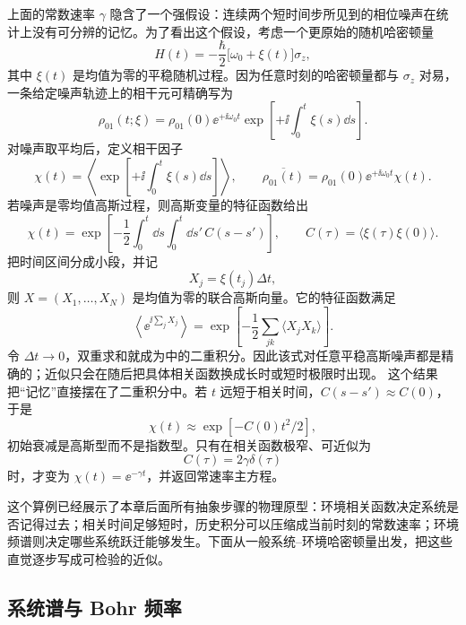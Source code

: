 上面的常数速率 \(\gamma\) 隐含了一个强假设：连续两个短时间步所见到的相位噪声在统计上没有可分辨的记忆。为了看出这个假设，考虑一个更原始的随机哈密顿量
\[
 H(t)=-\frac{\hbar}{2}\bigl[\omega_0+\xi(t)\bigr]\sigma_z,
\]
其中 \(\xi(t)\) 是均值为零的平稳随机过程。因为任意时刻的哈密顿量都与 \(\sigma_z\) 对易，一条给定噪声轨迹上的相干元可精确写为
\[
 \rho_{01}(t;\xi)
 =\rho_{01}(0)\ee^{+\ii\omega_0t}
 \exp\!\left[+\ii\int_0^t\xi(s)\dd s\right].
\]
对噪声取平均后，定义相干因子
\begin{equation}
 \chi(t)=\left\langle
 \exp\!\left[+\ii\int_0^t\xi(s)\dd s\right]
 \right\rangle,
 \qquad
 \overline{\rho_{01}(t)}
 =\rho_{01}(0)\ee^{+\ii\omega_0t}\chi(t).
 \label{eq:phys-oqs-classical-noise-coherence}
\end{equation}
若噪声是零均值高斯过程，则高斯变量的特征函数给出
\begin{equation}
 \chi(t)=\exp\!\left[
 -\frac12\int_0^t\dd s\int_0^t\dd s'\,
 C(s-s')
 \right],
 \qquad
 C(\tau)=\langle\xi(\tau)\xi(0)\rangle.
\label{eq:phys-oqs-gaussian-noise-coherence}
\end{equation}
把时间区间分成小段，并记
\[
 X_j=\xi(t_j)\Delta t,
 \]
则 \(X=(X_1,\ldots,X_N)\) 是均值为零的联合高斯向量。它的特征函数满足
\[
 \left\langle\ee^{\ii\sum_j X_j}\right\rangle
 =\exp\!\left[-\frac12\sum_{jk}\langle X_jX_k\rangle\right].
\]
令 \(\Delta t\to0\)，双重求和就成为中的二重积分。因此该式对任意平稳高斯噪声都是精确的；近似只会在随后把具体相关函数换成长时或短时极限时出现。
这个结果把“记忆”直接摆在了二重积分中。若 \(t\) 远短于相关时间，\(C(s-s')\approx C(0)\)，于是
\[
 \chi(t)\approx\exp[-C(0)t^2/2],
\]
初始衰减是高斯型而不是指数型。只有在相关函数极窄、可近似为
\[
 C(\tau)=2\gamma\delta(\tau)
\]
时，才变为 \(\chi(t)=\ee^{-\gamma t}\)，并返回常速率主方程。

这个算例已经展示了本章后面所有抽象步骤的物理原型：环境相关函数决定系统是否记得过去；相关时间足够短时，历史积分可以压缩成当前时刻的常数速率；环境频谱则决定哪些系统跃迁能够发生。下面从一般系统--环境哈密顿量出发，把这些直觉逐步写成可检验的近似。

\subsection{系统谱与 Bohr 频率}


